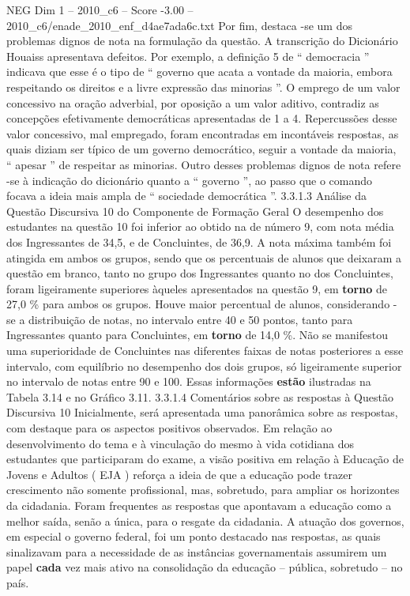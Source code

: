 \begin{textsample}{NEG Dim 1 – 2010\_c6 – Score -3.00 – 2010\_c6/enade\_2010\_enf\_d4ae7ada6c.txt}
Por fim, destaca -se um dos problemas dignos de nota na formulação da questão.
A transcrição do Dicionário Houaiss apresentava defeitos.
Por exemplo, a definição 5 de “ democracia ” indicava que esse é o tipo de “ governo que acata a vontade da maioria, embora respeitando os direitos e a livre expressão das minorias ”.
O emprego de um valor concessivo na oração adverbial, por oposição a um valor aditivo, contradiz as concepções efetivamente democráticas apresentadas de 1 a 4.
Repercussões desse valor concessivo, mal empregado, foram encontradas em incontáveis respostas, as quais diziam ser típico de um governo democrático, seguir a vontade da maioria, “ apesar ” de respeitar as minorias.
Outro desses problemas dignos de nota refere -se à indicação do dicionário quanto a “ governo ”, ao passo que o comando focava a ideia mais ampla de “ sociedade democrática ”. 3.3.1.3 Análise da Questão Discursiva 10 do Componente de Formação Geral O desempenho dos estudantes na questão 10 foi inferior ao obtido na de número 9, com nota média dos Ingressantes de 34,5, e de Concluintes, de 36,9.
A nota máxima também foi atingida em ambos os grupos, sendo que os percentuais de alunos que deixaram a questão em branco, tanto no grupo dos Ingressantes quanto no dos Concluintes, foram ligeiramente superiores àqueles apresentados na questão 9, em \textbf{torno} de 27,0 \% para ambos os grupos.
Houve maior percentual de alunos, considerando -se a distribuição de notas, no intervalo entre 40 e 50 pontos, tanto para Ingressantes quanto para Concluintes, em \textbf{torno} de 14,0 \%.
Não se manifestou uma superioridade de Concluintes nas diferentes faixas de notas posteriores a esse intervalo, com equilíbrio no desempenho dos dois grupos, só ligeiramente superior no intervalo de notas entre 90 e 100.
Essas informações \textbf{estão} ilustradas na Tabela 3.14 e no Gráfico 3.11. 3.3.1.4 Comentários sobre as respostas à Questão Discursiva 10 Inicialmente, será apresentada uma panorâmica sobre as respostas, com destaque para os aspectos positivos observados.
Em relação ao desenvolvimento do tema e à vinculação do mesmo à vida cotidiana dos estudantes que participaram do exame, a visão positiva em relação à Educação de Jovens e Adultos ( EJA ) reforça a ideia de que a educação pode trazer crescimento não somente profissional, mas, sobretudo, para ampliar os horizontes da cidadania.
Foram frequentes as respostas que apontavam a educação como a melhor saída, senão a única, para o resgate da cidadania.
A atuação dos governos, em especial o governo federal, foi um ponto destacado nas respostas, as quais sinalizavam para a necessidade de as instâncias governamentais assumirem um papel \textbf{cada} vez mais ativo na consolidação da educação – pública, sobretudo – no país.

\end{textsample}
